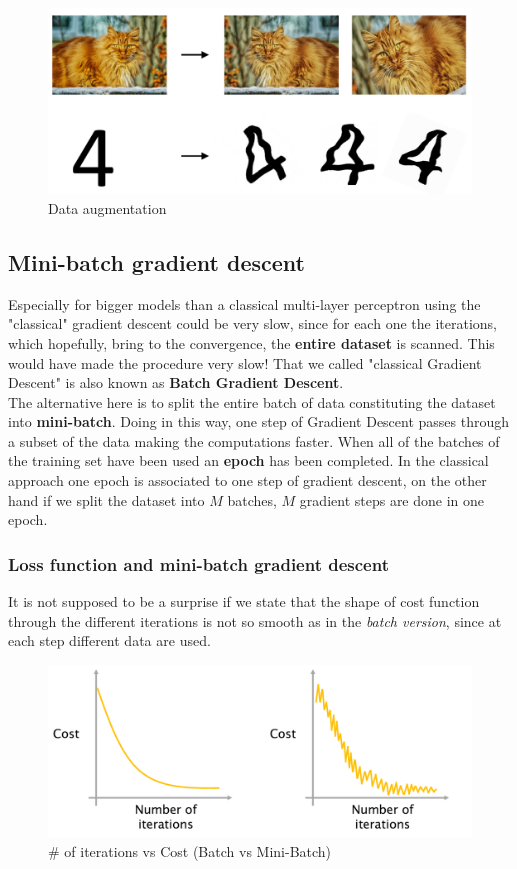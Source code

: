 \begin{figure}[h]
    \centering
    \includegraphics[scale=0.5]{img/data_sug.png}
    \caption{Data augmentation }
\end{figure}

\subsection{Mini-batch gradient descent}
Especially for bigger models than a classical multi-layer perceptron using the "classical" gradient descent could be very slow, since for each one the iterations, which hopefully, bring to the convergence, the \textbf{entire dataset} is scanned. This would have made the procedure very slow! That we called "classical Gradient Descent" is also known as \textbf{Batch Gradient Descent}.\\
The alternative here is to split the entire batch of data constituting the dataset into \textbf{mini-batch}. Doing in this way, one step of Gradient Descent passes through a subset of the data making the computations faster. When all of the batches of the training set have been used an \textbf{epoch} has been completed. In the classical approach one epoch is associated to one step of gradient descent, on the other hand if we split the dataset into $M$ batches, $M$ gradient steps are done in one epoch.

\subsubsection{Loss function and mini-batch gradient descent}
It is not supposed to be a surprise if we state that the shape of cost function through the different iterations is not so smooth as in the \textit{batch version}, since at each step different data are used.

\begin{figure}[h]
    \centering
    \includegraphics[scale=0.4]{img/mini-batch-iterations.png}
    \caption{\# of iterations vs Cost (Batch vs Mini-Batch)}
\end{figure}

